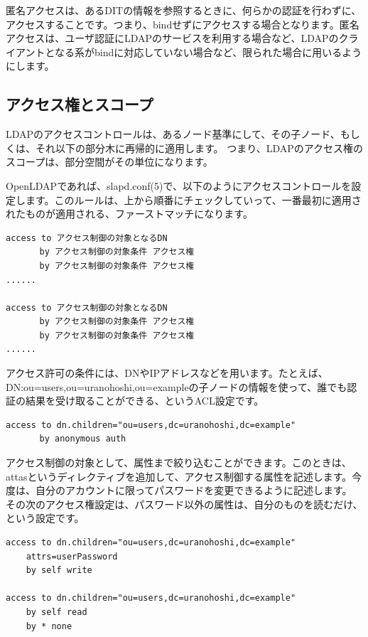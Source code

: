 匿名アクセスは、あるDITの情報を参照するときに、何らかの認証を行わずに、アクセスすることです。つまり、bindせずにアクセスする場合となります。匿名アクセスは、ユーザ認証にLDAPのサービスを利用する場合など、LDAPのクライアントとなる系がbindに対応していない場合など、限られた場合に用いるようにします。


\subsection{アクセス権とスコープ}

LDAPのアクセスコントロールは、あるノード基準にして、その子ノード、もしくは、それ以下の部分木に再帰的に適用します。
つまり、LDAPのアクセス権のスコープは、部分空間がその単位になります。

OpenLDAPであれば、slapd.conf(5)で、以下のようにアクセスコントロールを設定します。このルールは、上から順番にチェックしていって、一番最初に適用されたものが適用される、ファーストマッチになります。

\begin{verbatim}
access to アクセス制御の対象となるDN
　　　　by アクセス制御の対象条件 アクセス権
　　　　by アクセス制御の対象条件 アクセス権
......

access to アクセス制御の対象となるDN
　　　　by アクセス制御の対象条件 アクセス権
　　　　by アクセス制御の対象条件 アクセス権
......
\end{verbatim}

アクセス許可の条件には、DNやIPアドレスなどを用います。たとえば、DN:ou=users,ou=uranohoshi,ou=exampleの子ノードの情報を使って、誰でも認証の結果を受け取ることができる、というACL設定です。

\begin{verbatim}
access to dn.children="ou=users,dc=uranohoshi,dc=example"
　　　　by anonymous auth
\end{verbatim}

アクセス制御の対象として、属性まで絞り込むことができます。このときは、attasというディレクティブを追加して、アクセス制御する属性を記述します。今度は、自分のアカウントに限ってパスワードを変更できるように記述します。
その次のアクセス権設定は、パスワード以外の属性は、自分のものを読むだけ、という設定です。

\begin{verbatim}
access to dn.children="ou=users,dc=uranohoshi,dc=example"
    attrs=userPassword
    by self write

access to dn.children="ou=users,dc=uranohoshi,dc=example"
    by self read
    by * none
\end{verbatim}

